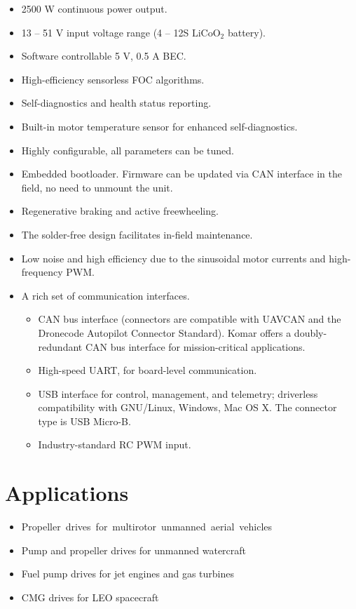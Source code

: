 \documentclass{../document_templates/documentation_template_latex/zubaxdoc}
\begin{document}
\begin{titlepage}
\begin{itemize}
    \item 2500 W continuous power output.
    \item 13 -- 51 V input voltage range (4 -- 12S $\text{LiCoO}_\text{2}$ battery).
    \item Software controllable 5 V, 0.5 A BEC.
    \item High-efficiency sensorless FOC algorithms.
    \item Self-diagnostics and health status reporting.
    \item Built-in motor temperature sensor for enhanced self-diagnostics.
    \item Highly configurable, all parameters can be tuned.
    \item Embedded bootloader. Firmware can be updated via CAN interface in the field, no need to unmount the unit.
    \item Regenerative braking and active freewheeling.
    \item The solder-free design facilitates in-field maintenance.
    \item Low noise and high efficiency due to the sinusoidal \mbox{motor} currents and high-frequency PWM.
    \item A rich set of communication interfaces.
     \begin{itemize}
        \item CAN bus interface (connectors are compatible with UAVCAN and the Dronecode Autopilot Connector Standard).
         Komar offers a doubly-redundant CAN bus interface for mission-critical applications.
        \item High-speed UART, for board-level communication.
        \item USB interface for control, management, and telemetry; driverless compatibility with GNU/Linux, Windows,
        Mac OS X. The connector type is USB Micro-B.
        \item Industry-standard RC PWM input.
    \end{itemize}
\end{itemize}

\section*{Applications}

\begin{itemize}
    \item \mbox{Propeller drives for multirotor unmanned aerial vehicles}
    \item Pump and propeller drives for unmanned watercraft
    \item Fuel pump drives for jet engines and gas turbines
    \item CMG drives for LEO spacecraft 
\end{itemize}


\end{titlepage}
\end{document}
